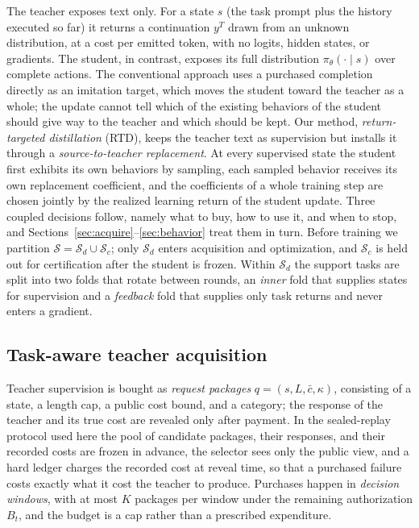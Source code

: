 The teacher exposes text only. For a state $s$ (the task prompt plus
the history executed so far) it returns a continuation $y^T$ drawn
from an unknown distribution, at a cost per emitted token, with no
logits, hidden states, or gradients. The student, in contrast, exposes
its full distribution $\pi_\theta(\cdot\mid s)$ over complete actions.
The conventional approach uses a purchased completion directly as an
imitation target, which moves the student toward the teacher as a
whole; the update cannot tell which of the existing behaviors of the
student should give way to the teacher and which should be kept. Our
method, \emph{return-targeted distillation} (RTD), keeps the teacher
text as supervision but installs it through a \emph{source-to-teacher
replacement}. At every supervised state the student first exhibits its
own behaviors by sampling, each sampled behavior receives its own
replacement coefficient, and the coefficients of a whole training
step are chosen jointly by the realized learning return of the
student update. Three coupled decisions follow, namely what to buy,
how to use it, and when to stop, and
Sections~\ref{sec:acquire}--\ref{sec:behavior} treat them in turn.
Before training we partition $\mathcal{S}=\mathcal{S}_d\cup\mathcal{S}_c$;
only $\mathcal{S}_d$ enters acquisition and optimization, and
$\mathcal{S}_c$ is held out for certification after the student is
frozen. Within $\mathcal{S}_d$ the support tasks are split into two
folds that rotate between rounds, an \emph{inner} fold that supplies
states for supervision and a \emph{feedback} fold that supplies only
task returns and never enters a gradient.

\subsection{Task-aware teacher acquisition}\label{sec:atoms}
\label{sec:acquire}

Teacher supervision is bought as \emph{request packages}
$q=(s,L,\bar c,\kappa)$, consisting of a state, a length cap, a public
cost bound, and a category; the response of the teacher and its true
cost are revealed only after payment. In the sealed-replay protocol
used here the pool of candidate packages, their responses, and their
recorded costs are frozen in advance, the selector sees only the
public view, and a hard ledger charges the recorded cost at reveal
time, so that a purchased failure costs exactly what it cost the
teacher to produce. Purchases happen in \emph{decision windows}, with
at most $K$ packages per window under the remaining authorization
$B_t$, and the budget is a cap rather than a prescribed expenditure.

